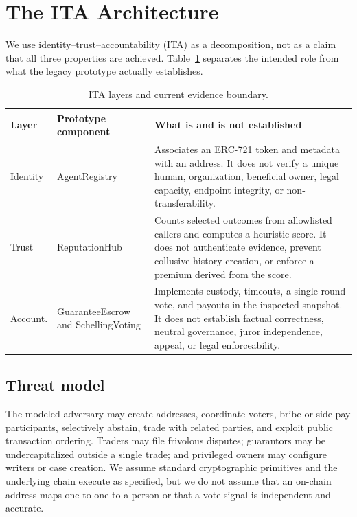 \section{The ITA Architecture}
\label{sec:ita}

We use identity--trust--accountability (ITA) as a decomposition, not as a claim that all three
properties are achieved. Table~\ref{tab:ita-scope} separates the intended role from what the legacy
prototype actually establishes.

\begin{table}[t]
\centering
\caption{ITA layers and current evidence boundary.}
\label{tab:ita-scope}
\small
\begin{tabular}{p{1.7cm}p{3.6cm}p{7.5cm}}
\toprule
Layer & Prototype component & What is and is not established \\
\midrule
Identity & \textsf{AgentRegistry} & Associates an ERC-721 token and metadata with an address. It
does not verify a unique human, organization, beneficial owner, legal capacity, endpoint integrity,
or non-transferability. \\
Trust & \textsf{ReputationHub} & Counts selected outcomes from allowlisted callers and computes a
heuristic score. It does not authenticate evidence, prevent collusive history creation, or enforce a
premium derived from the score. \\
Account. & \textsf{GuaranteeEscrow} and \textsf{SchellingVoting} & Implements custody,
timeouts, a single-round vote, and payouts in the inspected snapshot. It does not establish factual
correctness, neutral governance, juror independence, appeal, or legal enforceability. \\
\bottomrule
\end{tabular}
\end{table}

\subsection{Threat model}
The modeled adversary may create addresses, coordinate voters, bribe or side-pay participants,
selectively abstain, trade with related parties, and exploit public transaction ordering. Traders may
file frivolous disputes; guarantors may be undercapitalized outside a single trade; and privileged
owners may configure writers or case creation. We assume standard cryptographic primitives and the
underlying chain execute as specified, but we do not assume that an on-chain address maps one-to-one
to a person or that a vote signal is independent and accurate.

